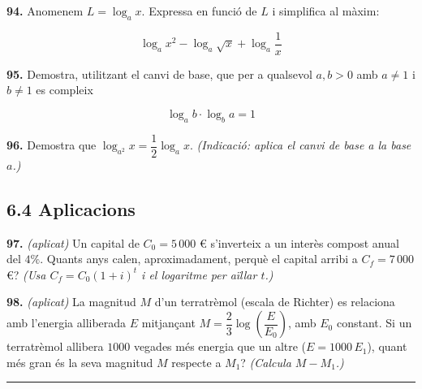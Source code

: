 \documentclass[13pt,a4paper]{extarticle}
\begin{document}
\par\noindent\begin{minipage}{\linewidth}
\textbf{94.} Anomenem $L=\log_a x$. Expressa en funció de $L$ i simplifica al màxim:\par

$$\log_a x^2-\log_a \sqrt{x}+\log_a \dfrac{1}{x}$$\par
\end{minipage}\par\vspace{1.6mm}
\par\noindent\begin{minipage}{\linewidth}
\textbf{95.} Demostra, utilitzant el canvi de base, que per a qualsevol $a,b>0$ amb $a\neq1$ i $b\neq1$ es compleix\par

$$\log_a b \cdot \log_b a = 1$$\par
\end{minipage}\par\vspace{1.6mm}
\par\noindent\begin{minipage}{\linewidth}
\textbf{96.} Demostra que $\log_{a^2} x = \dfrac12 \log_a x$. \emph{(Indicació: aplica el canvi de base a la base $a$.)}\par
\end{minipage}\par\vspace{1.6mm}
\subsection*{6.4 Aplicacions}

\par\noindent\begin{minipage}{\linewidth}
\textbf{97.} \emph{(aplicat)} Un capital de $C_0=5\,000$ \euro{} s'inverteix a un interès compost anual del $4\%$. Quants anys calen, aproximadament, perquè el capital arribi a $C_f=7\,000$ \euro{}? \emph{(Usa $C_f=C_0\left(1+i\right)^t$ i el logaritme per aïllar $t$.)}\par
\end{minipage}\par\vspace{1.6mm}
\par\noindent\begin{minipage}{\linewidth}
\textbf{98.} \emph{(aplicat)} La magnitud $M$ d'un terratrèmol (escala de Richter) es relaciona amb l'energia alliberada $E$ mitjançant $M=\dfrac{2}{3}\log\left(\dfrac{E}{E_0}\right)$, amb $E_0$ constant. Si un terratrèmol allibera $1000$ vegades més energia que un altre ($E=1000\,E_1$), quant més gran és la seva magnitud $M$ respecte a $M_1$? \emph{(Calcula $M-M_1$.)}\par
\end{minipage}\par\vspace{1.6mm}
\vspace{1mm}\hrule\vspace{3mm}
\end{document}
